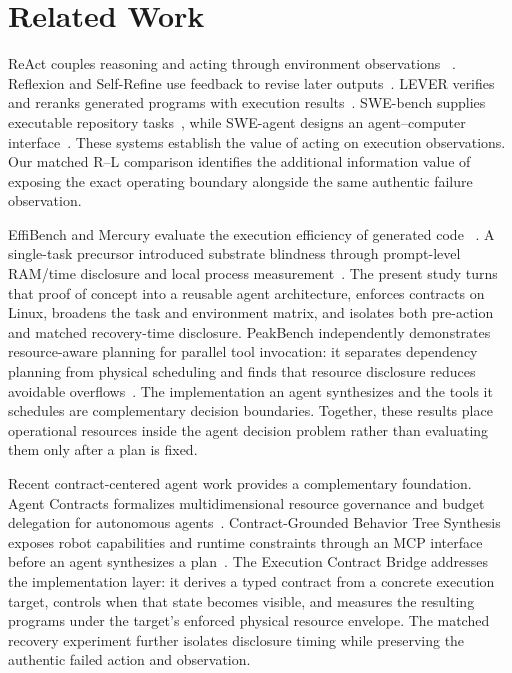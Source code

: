 \documentclass[sigconf,anonymous]{aamas}
\begin{document}
\section{Related Work}

ReAct couples reasoning and acting through environment observations
~\cite{yao2023react}. Reflexion and Self-Refine use feedback to revise later
outputs~\cite{shinn2023reflexion,madaan2023selfrefine}. LEVER verifies and reranks
generated programs with execution results~\cite{ni2023lever}. SWE-bench supplies
executable repository tasks~\cite{jimenez2024swebench}, while SWE-agent designs an
agent--computer interface~\cite{yang2024sweagent}. These systems establish the
value of acting on execution observations. Our matched R--L comparison identifies
the additional information value of exposing the exact operating boundary
alongside the same authentic failure observation.

EffiBench and Mercury evaluate the execution efficiency of generated code
~\cite{huang2024effibench,du2024mercury}. A single-task precursor introduced
substrate blindness through prompt-level RAM/time disclosure and local process
measurement~\cite{agrawal2026substrate}. The present study turns that proof of
concept into a reusable agent architecture, enforces contracts on Linux, broadens
the task and environment matrix, and isolates both pre-action and matched
recovery-time disclosure. PeakBench independently demonstrates resource-aware
planning for parallel tool invocation: it separates dependency planning from
physical scheduling and finds that resource disclosure reduces avoidable
overflows~\cite{chen2026peakbench}. The implementation an agent synthesizes and
the tools it schedules are complementary decision boundaries. Together, these
results place operational resources inside the agent decision problem rather
than evaluating them only after a plan is fixed.

Recent contract-centered agent work provides a complementary foundation.
Agent Contracts formalizes multidimensional resource governance and budget
delegation for autonomous agents~\cite{ye2026agentcontracts}. Contract-Grounded
Behavior Tree Synthesis exposes robot capabilities and runtime constraints through
an MCP interface before an agent synthesizes a plan~\cite{salfity2026contractgrounded}.
The Execution Contract Bridge addresses the implementation layer: it derives a
typed contract from a concrete execution target, controls when that state becomes
visible, and measures the resulting programs under the target's enforced physical
resource envelope. The matched recovery experiment further isolates disclosure
timing while preserving the authentic failed action and observation.
\end{document}
